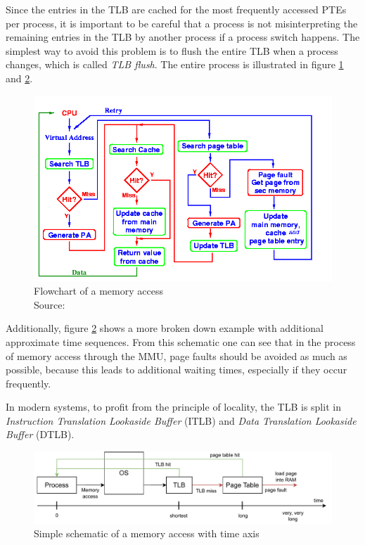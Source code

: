 Since the entries in the TLB are cached for the most frequently accessed PTEs per process, it is important to be careful that a process is not misinterpreting the remaining entries in the TLB by another process if a process switch happens. The simplest way to avoid this problem is to flush the entire TLB when a process changes, which is called \textit{TLB flush}. \cite[p. 191-192]{threeeasy} \cite{lwn_vm} \cite[p. 233-234]{tanenbaum} The entire process is illustrated in figure \ref{fig:memstatemachine} and \ref{fig:memaccesstime}.

\begin{figure}[H]
    \centering
    \includegraphics[width=.8\textwidth]{images/3_basics/mem_op.png}
    \caption{Flowchart of a memory access\\Source: \cite{pic:memop}}
    \label{fig:memstatemachine}
\end{figure}
\vspace{-\baselineskip}

Additionally, figure \ref{fig:memaccesstime} shows a more broken down example with additional approximate time sequences. From this schematic one can see that in the process of memory access through the MMU, page faults should be avoided as much as possible, because this leads to additional waiting times, especially if they occur frequently.

In modern systems, to profit from the principle of locality, the TLB is split in \textit{Instruction Translation Lookaside Buffer} (ITLB) and \textit{Data Translation Lookaside Buffer} (DTLB). \cite[p. 2, 4-5]{quantivapproach-ApL}

\vspace{\baselineskip}
\begin{figure}[H]
    \centering
    \includegraphics[width=\textwidth]{images/3_basics/mmu-more.pdf}
    \caption{Simple schematic of a memory access with time axis}
    \label{fig:memaccesstime}
\end{figure}
\vspace{-\baselineskip}

